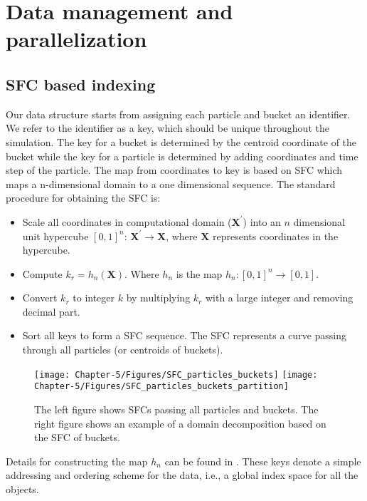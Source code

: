 \section{Data management and parallelization}
\subsection{SFC based indexing}
Our data structure starts from assigning each particle and bucket an identifier. We refer to the identifier as a key, which should be unique throughout the simulation. The key for a bucket is determined by the centroid coordinate of the bucket while the key for a particle is determined by adding coordinates and time step of the particle. The map from coordinates to key is based on SFC \citep{sagan2012space} which maps a n-dimensional domain to a one dimensional sequence. The standard procedure for obtaining the SFC is: 
\begin{itemize}
\item Scale all coordinates in computational domain ($\textbf{X}^\prime$) into an $n$ dimensional unit hypercube $[0,1]^n $: $\textbf{X}^\prime \rightarrow \textbf{X}$, where $\textbf{X}$ represents coordinates in the hypercube.
\item Compute $k_r = h_n(\textbf{X})$. Where $h_n$ is the map $h_n: [0,1]^n \rightarrow [0,1]$. 
\item Convert $k_r$ to integer $k$ by multiplying $k_r$ with a large integer and removing decimal part.
\item Sort all keys to form a SFC sequence. The SFC represents a curve passing through all particles (or centroids of buckets).
\end{itemize}
%
\begin{figure*}[!t]
\centering
\texttt{[image: Chapter-5/Figures/SFC\_particles\_buckets]}
\hfil
\texttt{[image: Chapter-5/Figures/SFC\_particles\_buckets\_partition]}
\caption{The left figure shows SFCs passing all particles and buckets. The right figure shows an example of a domain decomposition based on the SFC of buckets.}
\label{fig:SFC_domain_decomposition}
\end{figure*}
Details for constructing the map $h_n$ can be found in \citep{patra1995problem}. These keys denote a simple addressing and ordering scheme for the data, i.e., a global index space for all the objects.

